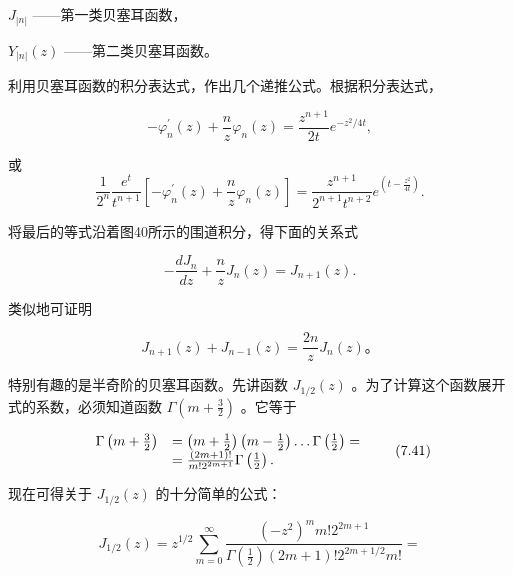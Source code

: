 $J_{|n|}$ ——第一类贝塞耳函数，

$Y_{|n|}(z)$ ——第二类贝塞耳函数。

利用贝塞耳函数的积分表达式，作出几个递推公式。根据积分表达式，

\begin{equation*}
- \varphi_ {n} ^ {\prime} (z) + \frac {n}{z} \varphi_ {n} (z) = \frac {z ^ {n + 1}}{2 t} e ^ {- z ^ {2} / 4 t},
\end{equation*}

或
\begin{equation*}
\frac {1}{2 ^ {n}} \frac {e ^ {t}}{t ^ {n + 1}} \left[ - \varphi_ {n} ^ {\prime} (z) + \frac {n}{z} \varphi_ {n} (z) \right] = \frac {z ^ {n + 1}}{2 ^ {n + 1} t ^ {n + 2}} e ^ {(t - \frac {z ^ {2}}{4 t})}.
\end{equation*}

将最后的等式沿着图40所示的围道积分，得下面的关系式

\begin{equation*}
- \frac {d J _ {n}}{d z} + \frac {n}{z} J _ {n} (z) = J _ {n + 1} (z).\tag{7.39}
\end{equation*}

类似地可证明

\begin{equation*}
J _ {n + 1} (z) + J _ {n - 1} (z) = \frac {2 n}{z} J _ {n} (z) \text{。}\tag{7.40}
\end{equation*}

特别有趣的是半奇阶的贝塞耳函数。先讲函数 $J_{1/2}(z)$ 。为了计算这个函数展开式的系数，必须知道函数 $\Gamma\left(m + \frac{3}{2}\right)$ 。它等于

\begin{equation*}
\begin{array}{r l} \Gamma \left(m + \frac {3}{2}\right) & = \left(m + \frac {1}{2}\right) \left(m - \frac {1}{2}\right) \dots \Gamma \left(\frac {1}{2}\right) = \\ & = \frac {(2 m + 1) !}{m ! 2 ^ {2 m + 1}} \Gamma \left(\frac {1}{2}\right). \end{array} \tag{7.41}
\end{equation*}

现在可得关于 $J_{1/2}(z)$ 的十分简单的公式：

\begin{equation*}
J _ {1 / 2} (z) = z ^ {1 / 2} \sum_ {m = 0} ^ {\infty} \frac {(- z ^ {2}) ^ {m} m ! 2 ^ {2 m + 1}}{\Gamma \left(\frac {1}{2}\right) (2 m + 1) ! 2 ^ {2 m + 1 / 2} m !} =
\end{equation*}

